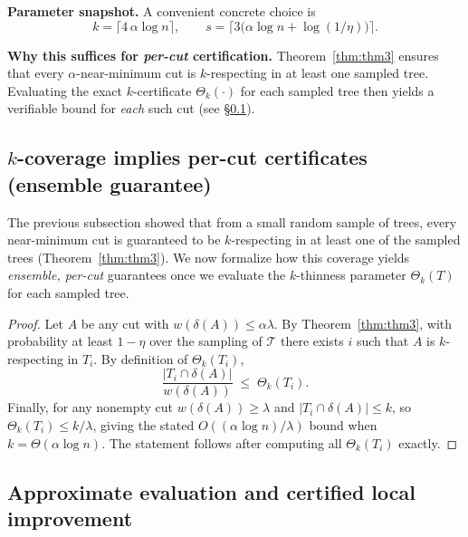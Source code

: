 \documentclass[11pt,letterpaper]{article}
\begin{document}
\medskip
\noindent\textbf{Parameter snapshot.}
A convenient concrete choice is
\[
k=\big\lceil 4\,\alpha\log n\big\rceil,\qquad
s=\big\lceil 3\big(\alpha\log n+\log(1/\eta)\big)\big\rceil.
\]

\medskip
\noindent\textbf{Why this suffices for \emph{per-cut} certification.}
Theorem~\ref{thm:thm3} ensures that every $\alpha$-near-minimum cut is $k$-respecting
in at least one sampled tree. Evaluating the exact $k$-certificate $\Theta_k(\cdot)$
for each sampled tree then yields a verifiable bound for \emph{each} such cut (see §\ref{sec:k-to-global}).

\subsection{$k$-coverage implies per-cut certificates (ensemble guarantee)}
\label{sec:k-to-global}
The previous subsection showed that from a small random sample of trees, every near-minimum cut is guaranteed to be $k$-respecting in at least one of the sampled trees (Theorem~\ref{thm:thm3}). We now formalize how this coverage yields \emph{ensemble, per-cut} guarantees once we evaluate the $k$-thinness parameter $\Theta_k(T)$ for each sampled tree.

\ensemblecert*

\begin{proof}
Let $A$ be any cut with $w(\delta(A))\le \alpha\lambda$. By Theorem~\ref{thm:thm3}, with probability at least $1-\eta$ over the sampling of $\mathcal{T}$ there exists $i$ such that $A$ is $k$-respecting in $T_i$. By definition of $\Theta_k(T_i)$,
\[
\frac{|T_i\cap\delta(A)|}{w(\delta(A))} \;\le\; \Theta_k(T_i).
\]
Finally, for any nonempty cut $w(\delta(A))\ge \lambda$ and $|T_i\cap\delta(A)|\le k$, so $\Theta_k(T_i)\le k/\lambda$, giving the stated $O((\alpha\log n)/\lambda)$ bound when $k=\Theta(\alpha\log n)$. The statement follows after computing all $\Theta_k(T_i)$ exactly.
\end{proof}

\subsection{Approximate evaluation and certified local improvement}
\label{sec:approx-and-local}
\end{document}
